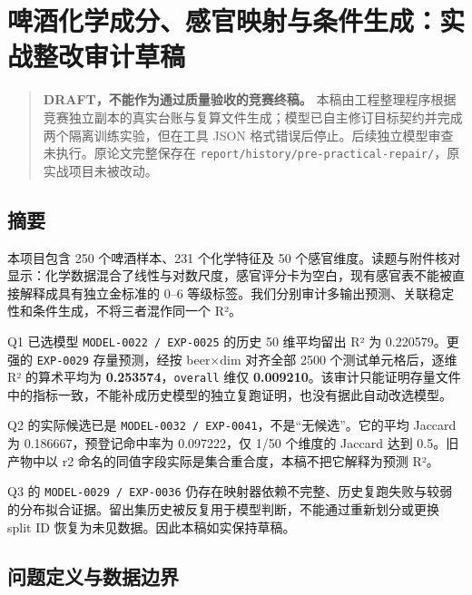 \documentclass[
  a4paper,12pt]{article}
\author{}
\date{}
\begin{document}
\renewcommand*\contentsname{目录}
{
\setcounter{tocdepth}{1}
\tableofcontents
}
\section{啤酒化学成分、感官映射与条件生成：实战整改审计草稿}\label{ux5564ux9152ux5316ux5b66ux6210ux5206ux611fux5b98ux6620ux5c04ux4e0eux6761ux4ef6ux751fux6210ux5b9eux6218ux6574ux6539ux5ba1ux8ba1ux8349ux7a3f}

\begin{quote}
\textbf{DRAFT，不能作为通过质量验收的竞赛终稿。}
本稿由工程整理程序根据竞赛独立副本的真实台账与复算文件生成；模型已自主修订目标契约并完成两个隔离训练实验，但在工具
JSON 格式错误后停止。后续独立模型审查未执行。原论文完整保存在
\texttt{report/history/pre-practical-repair/}，原实战项目未被改动。
\end{quote}

\subsection{摘要}\label{ux6458ux8981}

本项目包含 250 个啤酒样本、231 个化学特征及 50
个感官维度。读题与附件核对显示：化学数据混合了线性与对数尺度，感官评分卡为空白，现有感官表不能被直接解释成具有独立金标准的
0--6
等级标签。我们分别审计多输出预测、关联稳定性和条件生成，不将三者混作同一个
R²。

Q1 已选模型 \texttt{MODEL-0022\ /\ EXP-0025} 的历史 50 维平均留出 R² 为
0.220579。更强的 \texttt{EXP-0029} 存量预测，经按 beer×dim 对齐全部 2500
个测试单元格后，逐维 R² 的算术平均为 \textbf{0.253574}，\texttt{overall}
维仅
\textbf{0.009210}。该审计只能证明存量文件中的指标一致，不能补成历史模型的独立复跑证明，也没有据此自动改选模型。

Q2 的实际候选已是
\texttt{MODEL-0032\ /\ EXP-0041}，不是``无候选''。它的平均 Jaccard 为
0.186667，预登记命中率为 0.097222，仅 1/50 个维度的 Jaccard 达到
0.5。旧产物中以 r2 命名的同值字段实际是集合重合度，本稿不把它解释为预测
R²。

Q3 的 \texttt{MODEL-0029\ /\ EXP-0036}
仍存在映射器依赖不完整、历史复跑失败与较弱的分布拟合证据。留出集历史被反复用于模型判断，不能通过重新划分或更换
split ID 恢复为未见数据。因此本稿如实保持草稿。

\subsection{问题定义与数据边界}\label{ux95eeux9898ux5b9aux4e49ux4e0eux6570ux636eux8fb9ux754c}
\end{document}
